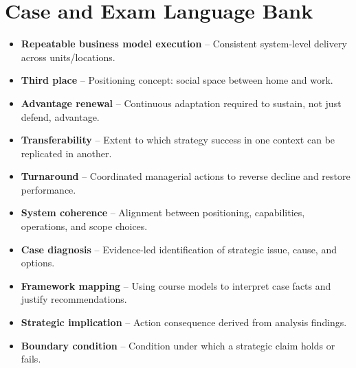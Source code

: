 \documentclass[10pt,a4paper]{article}
\newcommand{\vocab}[2]{\item \textbf{\textcolor{pinkmain}{#1}} -- #2}
\begin{document}
\section*{Case and Exam Language Bank}
\begin{itemize}
\vocab{Repeatable business model execution}{Consistent system-level delivery across units/locations.}
\vocab{Third place}{Positioning concept: social space between home and work.}
\vocab{Advantage renewal}{Continuous adaptation required to sustain, not just defend, advantage.}
\vocab{Transferability}{Extent to which strategy success in one context can be replicated in another.}
\vocab{Turnaround}{Coordinated managerial actions to reverse decline and restore performance.}
\vocab{System coherence}{Alignment between positioning, capabilities, operations, and scope choices.}
\vocab{Case diagnosis}{Evidence-led identification of strategic issue, cause, and options.}
\vocab{Framework mapping}{Using course models to interpret case facts and justify recommendations.}
\vocab{Strategic implication}{Action consequence derived from analysis findings.}
\vocab{Boundary condition}{Condition under which a strategic claim holds or fails.}
\end{itemize}
\end{document}
